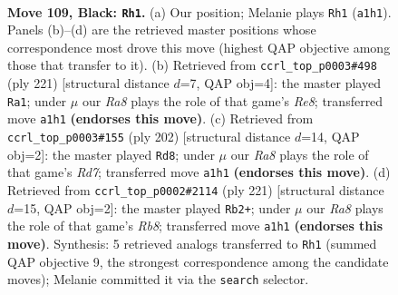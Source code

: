 \documentclass[11pt]{article}
\begin{document}
\clearpage

\begin{figure}[p]\centering
\begin{subfigure}{0.46\textwidth}\centering
\resizebox{\linewidth}{!}{%
\newchessgame
\chessboard[
  setfen={8/3k4/4p3/4P3/5PR1/8/1R3K2/r7 b - - 4 109},
  showmover=false,
  pgfstyle=straightmove, color=movearrow, markmove={a1-h1}
]}
\caption{}
\end{subfigure}\hfill
\begin{subfigure}{0.46\textwidth}\centering
\resizebox{\linewidth}{!}{%
\newchessgame
\chessboard[
  setfen={8/8/7k/6p1/6P1/1R3K1P/8/4r3 b - - 61 111},
  showmover=false,
  pgfstyle=straightmove, color=movearrow, markmove={e1-a1}
]}
\caption{}
\end{subfigure}
\\[4pt]
\begin{subfigure}{0.46\textwidth}\centering
\resizebox{\linewidth}{!}{%
\newchessgame
\chessboard[
  setfen={8/3R4/5k2/8/1r3p2/5P2/6PK/8 w - - 11 102},
  showmover=false,
  pgfstyle=straightmove, color=movearrow, markmove={d7-d8}
]}
\caption{}
\end{subfigure}\hfill
\begin{subfigure}{0.46\textwidth}\centering
\resizebox{\linewidth}{!}{%
\newchessgame
\chessboard[
  setfen={7R/8/6k1/6p1/4P3/5P2/6K1/1r6 b - - 60 111},
  showmover=false,
  pgfstyle=straightmove, color=movearrow, markmove={b1-b2}
]}
\caption{}
\end{subfigure}
\caption{\textbf{Move 109, Black: \texttt{Rh1}.} (a) Our position; Melanie plays \texttt{Rh1} (\texttt{a1h1}). Panels (b)--(d) are the retrieved master positions whose correspondence most drove this move (highest QAP objective among those that transfer to it). (b) Retrieved from \texttt{ccrl\_top\_p0003\#498} (ply 221) [structural distance $d$=7, QAP obj=4]: the master played \texttt{Ra1}; under $\mu$ our \emph{Ra8} plays the role of that game's \emph{Re8}; transferred move \texttt{a1h1} \textbf{(endorses this move)}. (c) Retrieved from \texttt{ccrl\_top\_p0003\#155} (ply 202) [structural distance $d$=14, QAP obj=2]: the master played \texttt{Rd8}; under $\mu$ our \emph{Ra8} plays the role of that game's \emph{Rd7}; transferred move \texttt{a1h1} \textbf{(endorses this move)}. (d) Retrieved from \texttt{ccrl\_top\_p0002\#2114} (ply 221) [structural distance $d$=15, QAP obj=2]: the master played \texttt{Rb2+}; under $\mu$ our \emph{Ra8} plays the role of that game's \emph{Rb8}; transferred move \texttt{a1h1} \textbf{(endorses this move)}. Synthesis: 5 retrieved analogs transferred to \texttt{Rh1} (summed QAP objective 9, the strongest correspondence among the candidate moves); Melanie committed it via the \texttt{search} selector.}
\label{fig:thought-m217}
\end{figure}
\end{document}
